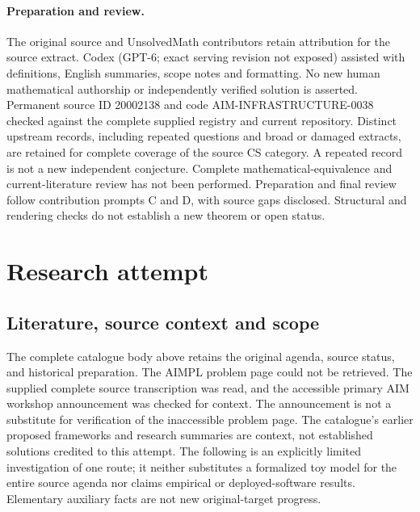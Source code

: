 \documentclass[11pt]{article}
\begin{document}
\paragraph{Preparation and review.}
The original source and UnsolvedMath contributors retain attribution for the source extract. Codex (GPT-6; exact serving revision not exposed) assisted with definitions, English summaries, scope notes and formatting. No new human mathematical authorship or independently verified solution is asserted. Permanent source ID 20002138 and code AIM-INFRASTRUCTURE-0038 checked against the complete supplied registry and current repository. Distinct upstream records, including repeated questions and broad or damaged extracts, are retained for complete coverage of the source CS category. A repeated record is not a new independent conjecture. Complete mathematical-equivalence and current-literature review has not been performed. Preparation and final review follow contribution prompts C and D, with source gaps disclosed. Structural and rendering checks do not establish a new theorem or open status.
\label{end:20002138}

\section{Research attempt}
\subsection{Literature, source context and scope}
The complete catalogue body above retains the original agenda, source status, and historical preparation. The AIMPL problem page could not be retrieved. The supplied complete source transcription was read, and the accessible primary AIM workshop announcement was checked for context. The announcement is not a substitute for verification of the inaccessible problem page. The catalogue's earlier proposed frameworks and research summaries are context, not established solutions credited to this attempt. The following is an explicitly limited investigation of one route; it neither substitutes a formalized toy model for the entire source agenda nor claims empirical or deployed-software results. Elementary auxiliary facts are not new original-target progress.
\end{document}
